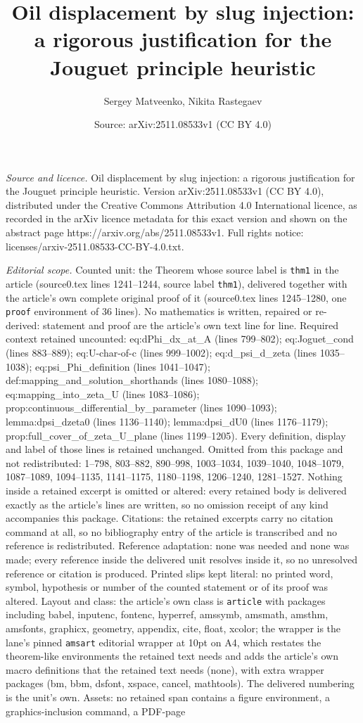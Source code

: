 \documentclass[10pt,a4paper]{amsart}
\title[Oil displacement by slug injection: a rigorous justification]{Oil displacement by slug injection: a rigorous justification for the Jouguet principle heuristic}
\author{Sergey Matveenko, Nikita Rastegaev}
\date{Source: arXiv:2511.08533v1 (CC BY 4.0)}
\begin{document}
\maketitle

\noindent\emph{Source and licence.} Oil displacement by slug injection: a rigorous justification for the Jouguet principle heuristic. Version arXiv:2511.08533v1 (CC BY 4.0), distributed under the Creative Commons Attribution 4.0 International licence, as recorded in the arXiv licence metadata for this exact version and shown on the abstract page https://arxiv.org/abs/2511.08533v1. Full rights notice: licenses/arxiv-2511.08533-CC-BY-4.0.txt.\par\smallskip

\noindent\textit{Editorial scope.} Counted unit: the Theorem whose source label is \texttt{thm1} in the article (source0.tex lines 1241--1244, source label \texttt{thm1}), delivered together with the article's own complete original proof of it (source0.tex lines 1245--1280, one \texttt{proof} environment of 36 lines). No mathematics is written, repaired or re-derived: statement and proof are the article's own text line for line. Required context retained uncounted: eq:dPhi\_dx\_at\_A (lines 799--802); eq:Joguet\_cond (lines 883--889); eq:U-char-of-c (lines 999--1002); eq:d\_psi\_d\_zeta (lines 1035--1038); eq:psi\_Phi\_definition (lines 1041--1047); def:mapping\_and\_solution\_shorthands (lines 1080--1088); eq:mapping\_into\_zeta\_U (lines 1083--1086); prop:continuous\_differential\_by\_parameter (lines 1090--1093); lemma:dpsi\_dzeta0 (lines 1136--1140); lemma:dpsi\_dU0 (lines 1176--1179); prop:full\_cover\_of\_zeta\_U\_plane (lines 1199--1205). Every definition, display and label of those lines is retained unchanged. Omitted from this package and not redistributed: 1--798, 803--882, 890--998, 1003--1034, 1039--1040, 1048--1079, 1087--1089, 1094--1135, 1141--1175, 1180--1198, 1206--1240, 1281--1527. Nothing inside a retained excerpt is omitted or altered: every retained body is delivered exactly as the article's lines are written, so no omission receipt of any kind accompanies this package. Citations: the retained excerpts carry no citation command at all, so no bibliography entry of the article is transcribed and no reference is redistributed. Reference adaptation: none was needed and none was made; every reference inside the delivered unit resolves inside it, so no unresolved reference or citation is produced. Printed slips kept literal: no printed word, symbol, hypothesis or number of the counted statement or of its proof was altered. Layout and class: the article's own class is \texttt{article} with packages including babel, inputenc, fontenc, hyperref, amssymb, amsmath, amsthm, amsfonts, graphicx, geometry, appendix, cite, float, xcolor; the wrapper is the lane's pinned \texttt{amsart} editorial wrapper at 10pt on A4, which restates the theorem-like environments the retained text needs and adds the article's own macro definitions that the retained text needs (none), with extra wrapper packages (bm, bbm, dsfont, xspace, cancel, mathtools). The delivered numbering is the unit's own. Assets: no retained span contains a figure environment, a graphics-inclusion command, a PDF-page 
\end{document}
